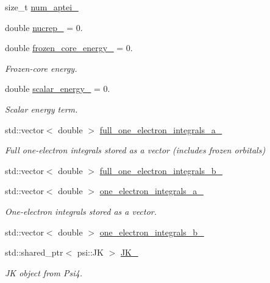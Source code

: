 \begin{DoxyCompactItemize}
size\+\_\+t \mbox{\hyperlink{classforte_1_1_forte_integrals_a2771a7fb9101ca7fd335746986e9d75f}{num\+\_\+aptei\+\_\+}}
\item 
double \mbox{\hyperlink{classforte_1_1_forte_integrals_aa5d263203e19d829eacb573af9e65a10}{nucrep\+\_\+}} = 0.
\item 
double \mbox{\hyperlink{classforte_1_1_forte_integrals_ad1662715d02f90e5a5a8ad21ff6678d9}{frozen\+\_\+core\+\_\+energy\+\_\+}} = 0.
\begin{DoxyCompactList}\small\item\em Frozen-\/core energy. \end{DoxyCompactList}\item 
double \mbox{\hyperlink{classforte_1_1_forte_integrals_aa7e9d38826e27e61eaedbe649f83f564}{scalar\+\_\+energy\+\_\+}} = 0.
\begin{DoxyCompactList}\small\item\em Scalar energy term. \end{DoxyCompactList}\item 
std\+::vector$<$ double $>$ \mbox{\hyperlink{classforte_1_1_forte_integrals_a6017ecb2f221d2515f2920e4190aa8ea}{full\+\_\+one\+\_\+electron\+\_\+integrals\+\_\+a\+\_\+}}
\begin{DoxyCompactList}\small\item\em Full one-\/electron integrals stored as a vector (includes frozen orbitals) \end{DoxyCompactList}\item 
std\+::vector$<$ double $>$ \mbox{\hyperlink{classforte_1_1_forte_integrals_a494b96e304db8fa9b24a1f60f99bc8a7}{full\+\_\+one\+\_\+electron\+\_\+integrals\+\_\+b\+\_\+}}
\item 
std\+::vector$<$ double $>$ \mbox{\hyperlink{classforte_1_1_forte_integrals_ad6df989214f6653702821bf048a49c02}{one\+\_\+electron\+\_\+integrals\+\_\+a\+\_\+}}
\begin{DoxyCompactList}\small\item\em One-\/electron integrals stored as a vector. \end{DoxyCompactList}\item 
std\+::vector$<$ double $>$ \mbox{\hyperlink{classforte_1_1_forte_integrals_a44cb55039d6b53a7572358db609e2782}{one\+\_\+electron\+\_\+integrals\+\_\+b\+\_\+}}
\item 
std\+::shared\+\_\+ptr$<$ psi\+::\+JK $>$ \mbox{\hyperlink{classforte_1_1_forte_integrals_a8535e687a9a82e87983f68d3e9921eba}{J\+K\+\_\+}}
\begin{DoxyCompactList}\small\item\em JK object from Psi4. \end{DoxyCompactList}\item 

\end{DoxyCompactItemize}
